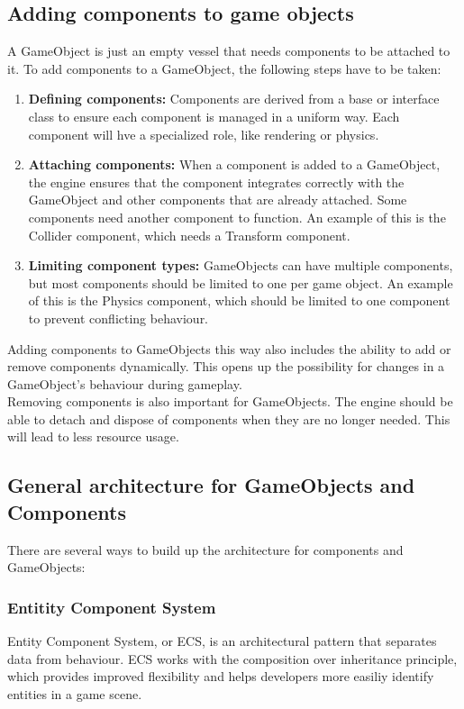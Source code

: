 \subsection{Adding components to game objects}
A GameObject is just an empty vessel that needs components to be attached to it.
To add components to a GameObject, the following steps have to be taken:
\begin{enumerate}
      \item \textbf{Defining components:}
            Components are derived from a base or interface class to ensure each component is managed in a uniform way.
            Each component will hve a specialized role, like rendering or physics.
      \item \textbf{Attaching components:}
            When a component is added to a GameObject, the engine ensures that the component integrates correctly with 
            the GameObject and other components that are already attached. Some components need another component to function.
            An example of this is the Collider component, which needs a Transform component.
      \item \textbf{Limiting component types:}
            GameObjects can have multiple components, but most components should be limited to one per game object.
            An example of this is the Physics component, which should be limited to one component to prevent conflicting behaviour.
\end{enumerate}

\noindent Adding components to GameObjects this way also includes the ability to add or remove components dynamically.
This opens up the possibility for changes in a GameObject's behaviour during gameplay.
\\
Removing components is also important for GameObjects.
The engine should be able to detach and dispose of components when they are no longer needed.
This will lead to less resource usage.

\subsection{General architecture for GameObjects and Components}
There are several ways to build up the architecture for components and GameObjects:

\subsubsection{Entitity Component System}
Entity Component System, or ECS, is an architectural pattern that separates data from behaviour.
ECS works with the composition over inheritance principle, which provides improved flexibility and helps developers more easiliy
identify entities in a game scene.

